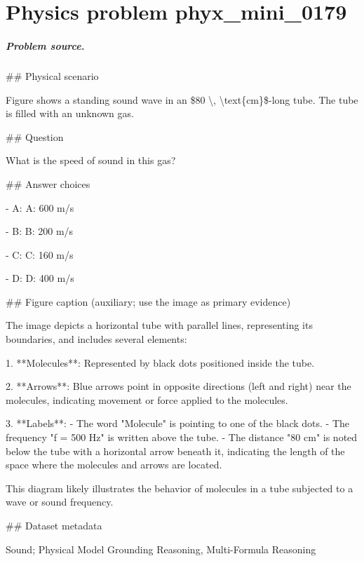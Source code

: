 
\chapter{Physics problem phyx\_mini\_0179}
\label{ch:PhyXMiniProblems_problem_phyx_mini_0179}

\paragraph{Problem source.}
\#\# Physical scenario

Figure shows a standing sound wave in an \$80 \textbackslash{}, \textbackslash{}text\{cm\}\$-long tube. The tube is filled with an unknown gas.

\#\# Question

What is the speed of sound in this gas?

\#\# Answer choices

- A: A: 600 m/s

- B: B: 200 m/s

- C: C: 160 m/s

- D: D: 400 m/s

\#\# Figure caption (auxiliary; use the image as primary evidence)

The image depicts a horizontal tube with parallel lines, representing its boundaries, and includes several elements:

1. **Molecules**: Represented by black dots positioned inside the tube.

2. **Arrows**: Blue arrows point in opposite directions (left and right) near the molecules, indicating movement or force applied to the molecules.

3. **Labels**:
   - The word "Molecule" is pointing to one of the black dots.
   - The frequency "f = 500 Hz" is written above the tube.
   - The distance "80 cm" is noted below the tube with a horizontal arrow beneath it, indicating the length of the space where the molecules and arrows are located.

This diagram likely illustrates the behavior of molecules in a tube subjected to a wave or sound frequency.

\#\# Dataset metadata

Sound; Physical Model Grounding Reasoning, Multi-Formula Reasoning

